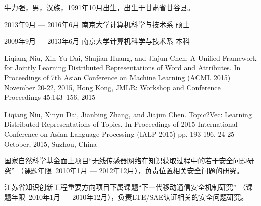\documentclass[master]{njuthesis}
\begin{document}
\nocite{*}

%
%


\backmatter
\begin{resume}
\begin{authorinfo}
\noindent 牛力强，男，汉族，1991年10月出生，出生于甘肃省甘谷县。
\end{authorinfo}
\begin{education}
\item[2013年9月 --- 2016年6月] 南京大学计算机科学与技术系 \hfill 硕士
\item[2009年9月 --- 2013年6月] 南京大学计算机科学与技术系 \hfill 本科
\end{education}
\begin{publications}
\item Liqiang Niu, Xin-Yu Dai, Shujian Huang, and Jiajun Chen. A Unified Framework for Jointly Learning Distributed Representations of Word and Attributes. In Proceedings of 7th Asian Conference on Machine Learning (ACML 2015) November 20-22, 2015, Hong Kong, JMLR: Workshop and Conference Proceedings 45:143–156, 2015
\item Liqiang Niu, Xinyu Dai, Jianbing Zhang, and Jiajun Chen. Topic2Vec: Learning Distributed Representations of Topics. In Proceedings of 2015 International Conference on Asian Language Processing (IALP 2015) pp. 193-196, 24-25 October, 2015, Suzhou, China
\end{publications}
\begin{projects}
\item 国家自然科学基金面上项目``无线传感器网络在知识获取过程中的若干安全问题研究''
（课题年限~2010年1月 --- 2012年12月），负责位置相关安全问题的研究。
\item 江苏省知识创新工程重要方向项目下属课题``下一代移动通信安全机制研究''
（课题年限~2010年1月 --- 2010年12月），负责LTE/SAE认证相关的安全问题研究。
\end{projects}
\end{resume}

\makelicense


\end{document}
